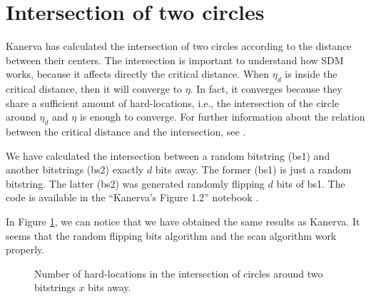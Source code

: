\section{Intersection of two circles}

Kanerva has calculated the intersection of two circles according to the distance between their centers. The intersection is important to understand how SDM works, because it affects directly the critical distance. When $\eta_d$ is inside the critical distance, then it will converge to $\eta$. In fact, it converges because they share a sufficient amount of hard-locations, i.e., the intersection of the circle around $\eta_d$ and $\eta$ is enough to converge. For further information about the relation between the critical distance and the intersection, see \citet{brogliato2014sparse}.

We have calculated the intersection between a random bitstring (bs1) and another bitstrings (bs2) exactly $d$ bits away. The former (bs1) is just a random bitstring. The latter (bs2) was generated randomly flipping $d$ bits of bs1. The code is available in the ``Kanerva's Figure 1.2'' notebook \citep{sdmframework}.

In Figure \ref{fig:validation-intersection}, we can notice that we have obtained the same results as Kanerva. It seems that the random flipping bits algorithm and the scan algorithm work properly.

\begin{figure}[!htb]
  \centering

  \caption{Number of hard-locations in the intersection of circles around two bitstrings $x$ bits away.}
  \label{fig:validation-intersection}
\end{figure}


